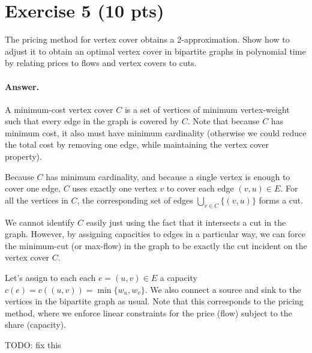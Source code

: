 \documentclass[a4paper]{article}
\begin{document}
\section*{Exercise 5 (10 pts)}

The pricing method for vertex cover obtains a 2-approximation. Show how to adjust it to obtain an optimal vertex cover in bipartite graphs in polynomial time by relating prices to flows and vertex covers to cuts.

\paragraph{Answer.}

A minimum-cost vertex cover $C$ is a set of vertices of minimum vertex-weight such that every edge in the graph is covered by $C$. Note that because $C$ has minimum cost, it also must have minimum cardinality (otherwise we could reduce the total cost by removing one edge, while maintaining the vertex cover property).

	\medskip

	Because $C$ has minimum cardinality, and because a single vertex is enough to cover one edge, $C$ uses exactly one vertex $v$ to cover each edge $(v,u) \in E$. For all the vertices in $C$, the corresponding set of edges $\bigcup_{v \in C}\{(v,u)\}$ forms a cut.
	
	\medskip
	
	We cannot identify $C$ easily just using the fact that it intersects a cut in the graph. However, by assigning capacities to edges in a particular way, we can force the minimum-cut (or max-flow) in the graph to be exactly the cut incident on the vertex cover $C$.

	Let's assign to each each $e = (u,v) \in E$ a capacity $c(e) = c((u,v)) = \min\{w_u, w_v\}$. We also connect a source and sink to the vertices in the  bipartite graph as usual. Note that this corresponds to the pricing method, where we enforce linear constraints for the price (flow) subject to the share (capacity).
	
	{\color{red} TODO: fix this}
\end{document}
